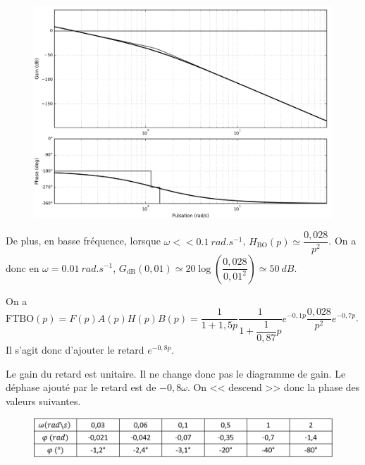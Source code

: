 \begin{corrige}
\begin{figure}[H]
\centering

\includegraphics[width=.8\linewidth]{images/cor_q15_bode}
\end{figure}

De plus, en basse fréquence, lorsque 
$\omega << \SI{0,1}{rad.s^{-1}}$, 
$H_{\text{BO}}(p)\simeq \dfrac{0,028}{p^2}$. 
On a donc  en $\omega = \SI{0,01}{rad.s^{-1}}$, $G_{\text{dB}}(0,01)\simeq 20\log \left(\dfrac{0,028}{0,01^2}\right)\simeq \SI{50}{dB}$.


\end{corrige}
\else
\fi

\ifprof
\begin{corrige}
On a $\text{FTBO}(p)=F(p)A(p)H(p)B(p)=\dfrac{1}{1 + 1,5p} \dfrac{1}{1+\dfrac{1}{0,87}p}e^{-0,1 p}  \dfrac{0,028}{p^2} e^{-0,7p}$. Il s'agit donc d'ajouter le retard $e^{-0,8 p}$.

Le gain du retard est unitaire. Il ne change donc pas le diagramme de gain.
Le déphase ajouté par le retard est de $-0,8\omega $. 
On << descend >> donc la phase des valeurs suivantes. 

\begin{figure}[H]
\centering
\includegraphics[width=.8\linewidth]{images/cor_q16}
\end{figure}


\end{corrige}

